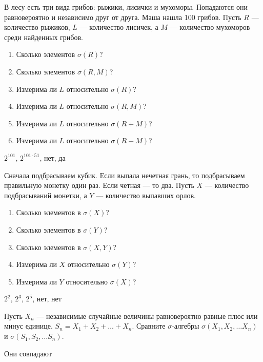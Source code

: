 \begin{problem}
В лесу есть три вида грибов: рыжики, лисички и мухоморы. Попадаются они равновероятно и независимо друг от друга. Маша нашла 100 грибов. Пусть $R$ — количество рыжиков, $L$ — количество лисичек, а $M$ — количество мухоморов среди найденных грибов.
\begin{enumerate}
\item Сколько элементов $ \sigma(R)$?
\item Сколько элементов $ \sigma(R,M)$?
\item Измерима ли $L$ относительно $ \sigma(R)$?
\item Измерима ли $L$ относительно $ \sigma(R,M)$?
\item Измерима ли $L$ относительно $ \sigma(R+M)$?
\item Измерима ли $L$ относительно $ \sigma(R-M)$?
\end{enumerate}

\begin{sol}
$ 2^{101} $, $2^{101\cdot 51}$, нет, да
\end{sol}
\end{problem}

\begin{problem}
Сначала подбрасываем кубик. Если выпала нечетная грань, то подбрасываем правильную монетку один раз. 
Если четная — то два. Пусть $X$ — количество подбрасываний монетки, а $Y$ — количество выпавших орлов.

\begin{enumerate}

\item Сколько элементов в $ \sigma(X)$?
\item Сколько элементов в $ \sigma(Y)$?
\item Сколько элементов в $ \sigma(X,Y)$?
\item Измерима ли $ X $ относительно $ \sigma(Y)$?
\item Измерима ли $ Y $ относительно $ \sigma(X)$?

\end{enumerate}

\begin{sol}
 $ 2^{2} $, $ 2^{3} $, $ 2^{5} $, нет, нет
\end{sol}
\end{problem}

\begin{problem}
Пусть $X_{n}$ — независимые случайные величины равновероятно равные плюс или минус единице. $S_{n}=X_{1}+X_{2}+\ldots+X_{n}$. Сравните $\sigma$-алгебры $ \sigma(X_{1},X_{2},\ldots X_{n}) $ и $ \sigma(S_{1},S_{2},\ldots S_{n}) $.

\begin{sol}
Они совпадают
\end{sol}
\end{problem}

